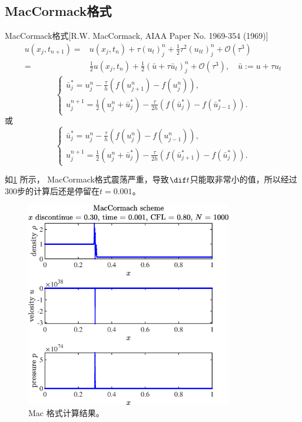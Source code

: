 \documentclass[12pt]{article}
\begin{document}
\subsection{MacCormack格式}

MacCormack格式[R.W. MacCormack, AIAA Paper No. 1969-354 (1969)]
\begin{equation}
	\begin{aligned}
		u\left(x_{j}, t_{n+1}\right)=& u\left(x_{j}, t_{n}\right)+\tau\left(u_{t}\right)_{j}^{n}+\frac{1}{2} \tau^{2}\left(u_{t t}\right)_{j}^{n}+\mathcal{O}\left(\tau^{3}\right) \\
		=& \frac{1}{2} u\left(x_{j}, t_{n}\right)+\frac{1}{2}\left(\bar{u}+\tau \bar{u}_{t}\right)_{j}^{n}+\mathcal{O}\left(\tau^{3}\right), \quad \bar{u}:=u+\tau u_{t} 
		\end{aligned}
\end{equation}
\begin{equation}
		\left\{\begin{array}{l}
		\bar{u}_{j}^{*}=u_{j}^{n}-\frac{\tau}{h}\left(f\left(u_{j+1}^{n}\right)-f\left(u_{j}^{n}\right)\right), \\
		u_{j}^{n+1}=\frac{1}{2}\left(u_{j}^{n}+\bar{u}_{j}^{*}\right)-\frac{\tau}{2 h}\left(f\left(\bar{u}_{j}^{*}\right)-f\left(\bar{u}_{j-1}^{*}\right)\right).
		\end{array}\right.
\end{equation}
或
\begin{equation}
	\left\{\begin{array}{l}
		\bar{u}_{j}^{*}=u_{j}^{n}-\frac{\tau}{h}\left(f\left(u_{j}^{n}\right)-f\left(u_{j-1}^{n}\right)\right), \\
		u_{j}^{n+1}=\frac{1}{2}\left(u_{j}^{n}+\bar{u}_{j}^{*}\right)-\frac{\tau}{2 h}\left(f\left(\bar{u}_{j+1}^{*}\right)-f\left(\bar{u}_{j}^{*}\right)\right).
		\end{array}\right.
\end{equation}

如\cref{fig:2Mac} 所示， MacCormack格式震荡严重，导致$\dif t$只能取非常小的值，所以经过$300$步的计算后还是停留在$t=0.001$。

\begin{figure}[htp]
	\centering
	\includegraphics[width=9cm]{2Mac.eps}
	\vspace{20pt}
	\caption{Mac 格式计算结果。}
	\label{fig:2Mac}
\end{figure}
\end{document}
